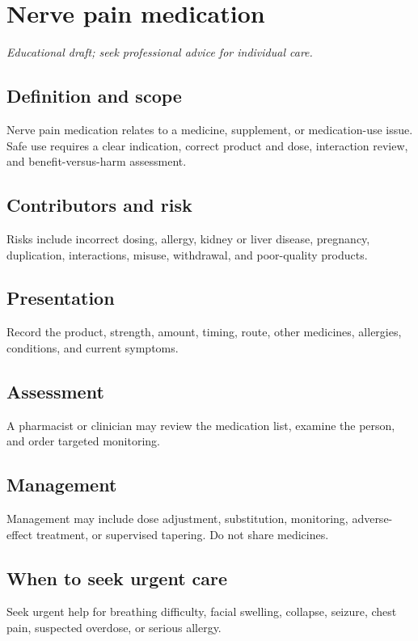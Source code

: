 \chapter{Nerve pain medication}

\medskip
\noindent\textit{Educational draft; seek professional advice for individual care.}

\section*{Definition and scope}
Nerve pain medication relates to a medicine, supplement, or medication-use issue. Safe use requires a clear indication, correct product and dose, interaction review, and benefit-versus-harm assessment.

\section*{Contributors and risk}
Risks include incorrect dosing, allergy, kidney or liver disease, pregnancy, duplication, interactions, misuse, withdrawal, and poor-quality products.

\section*{Presentation}
Record the product, strength, amount, timing, route, other medicines, allergies, conditions, and current symptoms.

\section*{Assessment}
A pharmacist or clinician may review the medication list, examine the person, and order targeted monitoring.

\section*{Management}
Management may include dose adjustment, substitution, monitoring, adverse-effect treatment, or supervised tapering. Do not share medicines.

\section*{When to seek urgent care}
Seek urgent help for breathing difficulty, facial swelling, collapse, seizure, chest pain, suspected overdose, or serious allergy.

